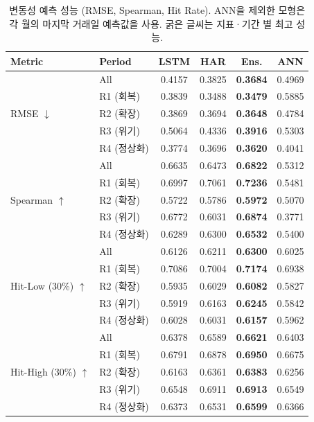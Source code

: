 \documentclass{article}
\begin{document}
\begin{table}[ht]
\centering
\caption{변동성 예측 성능 (RMSE, Spearman, Hit Rate). ANN을 제외한 모형은 각 월의 마지막 거래일 예측값을 사용. 굵은 글씨는 지표·기간 별 최고 성능.}
\label{tab:sigma_pred}
\setlength{\tabcolsep}{6pt}
\renewcommand{\arraystretch}{1.15}
\begin{tabular}{ll cccc}
\toprule
Metric & Period & LSTM & HAR & Ens. & ANN \\
\midrule
\multirow{5}{*}{RMSE $\downarrow$}
 & All       & 0.4157 & 0.3825 & \textbf{0.3684} & 0.4969 \\
 & R1 (회복)   & 0.3839 & 0.3488 & \textbf{0.3479} & 0.5885 \\
 & R2 (확장)   & 0.3869 & 0.3694 & \textbf{0.3648} & 0.4784 \\
 & R3 (위기)   & 0.5064 & 0.4336 & \textbf{0.3916} & 0.5303 \\
 & R4 (정상화) & 0.3774 & 0.3696 & \textbf{0.3620} & 0.4041 \\
\midrule
\multirow{5}{*}{Spearman $\uparrow$}
 & All       & 0.6635 & 0.6473 & \textbf{0.6822} & 0.5312 \\
 & R1 (회복)   & 0.6997 & 0.7061 & \textbf{0.7236} & 0.5481 \\
 & R2 (확장)   & 0.5722 & 0.5786 & \textbf{0.5972} & 0.5070 \\
 & R3 (위기)   & 0.6772 & 0.6031 & \textbf{0.6874} & 0.3771 \\
 & R4 (정상화) & 0.6289 & 0.6300 & \textbf{0.6532} & 0.5400 \\
\midrule
\multirow{5}{*}{Hit-Low (30\%) $\uparrow$}
 & All       & 0.6126 & 0.6211 & \textbf{0.6300} & 0.6025 \\
 & R1 (회복)   & 0.7086 & 0.7004 & \textbf{0.7174} & 0.6938 \\
 & R2 (확장)   & 0.5935 & 0.6029 & \textbf{0.6082} & 0.5827 \\
 & R3 (위기)   & 0.5919 & 0.6163 & \textbf{0.6245} & 0.5842 \\
 & R4 (정상화) & 0.6028 & 0.6031 & \textbf{0.6157} & 0.5962 \\
\midrule
\multirow{5}{*}{Hit-High (30\%) $\uparrow$}
 & All       & 0.6378 & 0.6589 & \textbf{0.6621} & 0.6403 \\
 & R1 (회복)   & 0.6791 & 0.6878 & \textbf{0.6950} & 0.6675 \\
 & R2 (확장)   & 0.6163 & 0.6361 & \textbf{0.6383} & 0.6256 \\
 & R3 (위기)   & 0.6548 & 0.6911 & \textbf{0.6913} & 0.6549 \\
 & R4 (정상화) & 0.6373 & 0.6531 & \textbf{0.6599} & 0.6366 \\
\bottomrule
\end{tabular}
\end{table}
\end{document}
